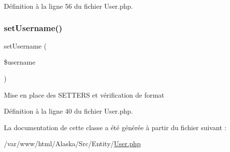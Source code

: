 Définition à la ligne 56 du fichier User.\+php.

\mbox{\label{class_src_1_1_entity_1_1_user_ac359b701a2ccaff746dd480f03314244}} 
\subsubsection{\texorpdfstring{set\+Username()}{setUsername()}}
{\footnotesize\ttfamily set\+Username (\begin{DoxyParamCaption}\item[{}]{\$username }\end{DoxyParamCaption})}

Mise en place des S\+E\+T\+T\+E\+RS et vérification de format 

Définition à la ligne 40 du fichier User.\+php.



La documentation de cette classe a été générée à partir du fichier suivant \+:\begin{DoxyCompactItemize}
\item 
/var/www/html/\+Alaska/\+Src/\+Entity/\hyperlink{_user_8php}{User.\+php}\end{DoxyCompactItemize}
